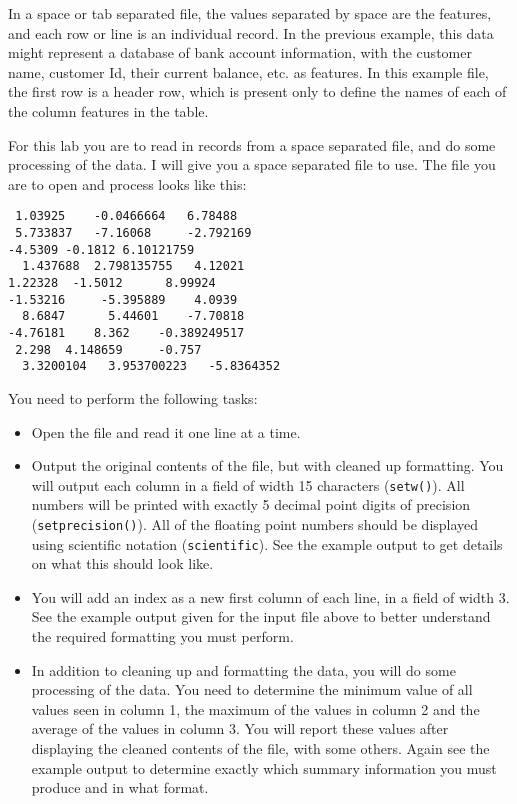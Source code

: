 \documentclass[11pt]{article}
\begin{document}
In a space or tab separated file, the values separated by space are
the features, and each row or line is an individual record.  In the
previous example, this data might represent a database of bank account
information, with the customer name, customer Id, their current
balance, etc. as features.  In this example file, the first row is a
header row, which is present only to define the names of each of the
column features in the table.

For this lab you are to read in records from a space separated file, and
do some processing of the data.  I will give you a space separated file
to use.  The file you are to open and process looks like this:

\begin{verbatim}
 1.03925	-0.0466664	 6.78488	
 5.733837	-7.16068	 -2.792169	
-4.5309	-0.1812	6.10121759	
  1.437688	2.798135755	  4.12021	
1.22328	 -1.5012	  8.99924	
-1.53216	 -5.395889	  4.0939	
  8.6847	  5.44601	 -7.70818	
-4.76181	8.362	 -0.389249517	
 2.298	4.148659	 -0.757	
  3.3200104	  3.953700223	-5.8364352
\end{verbatim}

You need to perform the following tasks:

\begin{itemize}
\item Open the file and read it one line at a time.
\item Output the original contents of the file, but with cleaned up
formatting.  You will output each column in a field of width 15
characters (\verb~setw()~).  All numbers will be printed with exactly 5
decimal point digits of precision (\verb~setprecision()~).  All of the
floating point numbers should be displayed using scientific notation
(\verb~scientific~).  See the example output to get details on what
this should look like.
\item You will add an index as a new first column of each line, in a field
of width 3.  See the example output given for the input file above
to better understand the required formatting you must perform.
\item In addition to cleaning up and formatting the data, you will do some
processing of the data.  You need to determine the minimum value of
all values seen in column 1, the maximum of the values in column 2
and the average of the values in column 3.  You will report these
values after displaying the cleaned contents of the file, with some
others.  Again see the example output to determine exactly which
summary information you must produce and in what format.
\end{itemize}
\end{document}
